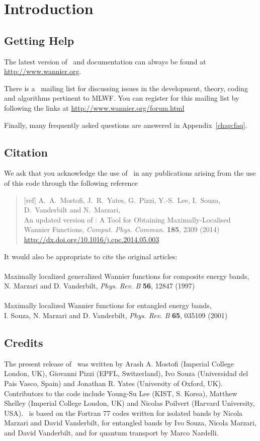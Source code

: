 \chapter*{Introduction}
\section*{Getting Help}
The latest version of \wannier\ and documentation can always
be found at \url{http://www.wannier.org}.

There is a \wannier\ mailing list for discussing issues in the
development, theory, coding and algorithms pertinent to MLWF.
You can register for this mailing list by following the links at
\url{http://www.wannier.org/forum.html}

Finally, many frequently asked questions are answered in
Appendix~\ref{chap:faq}. 

\section*{Citation}
We ask that you acknowledge the use of \wannier\ in any publications
arising from the use of this code through the following reference
\begin{quote}
[ref] A.~A.~Mostofi, J.~R.~Yates, G.~Pizzi, Y.-S.~Lee, I.~Souza, D.~Vanderbilt
and N.~Marzari,\\
An updated version of \wannier: 
A Tool for Obtaining Maximally-Localised Wannier
  Functions, {\it Comput. Phys. Commun.} {\bf 185}, 2309 (2014)\\
\url{http://dx.doi.org/10.1016/j.cpc.2014.05.003}

\end{quote}                                                              

It would also be appropriate to cite the original articles:\\\\
Maximally localized generalized Wannier functions for composite
  energy bands,\\ 
N. Marzari and D. Vanderbilt, {\it Phys. Rev. B} {\bf 56}, 12847 (1997)\\\\
Maximally localized Wannier functions for entangled energy bands,\\
I. Souza, N. Marzari and D. Vanderbilt, {\it Phys. Rev. B} {\bf 65}, 035109 (2001)


\section*{Credits}
The present release of \wannier\ was written by Arash A. Mostofi
(Imperial College London, UK), Giovanni Pizzi (EPFL, Switzerland), Ivo Souza 
(Universidad del Pais Vasco, Spain) and
Jonathan R. Yates (University of
Oxford, UK). Contributors to the code include
Young-Su Lee (KIST, S. Korea), 
Matthew Shelley (Imperial College London, UK)
and Nicolas Poilvert (Harvard University, USA).
 \wannier\ is
based on the Fortran 77 codes written for isolated bands by Nicola Marzari
and David Vanderbilt, for entangled bands by Ivo Souza, Nicola Marzari,
and David Vanderbilt, and for quantum transport by Marco Nardelli.

